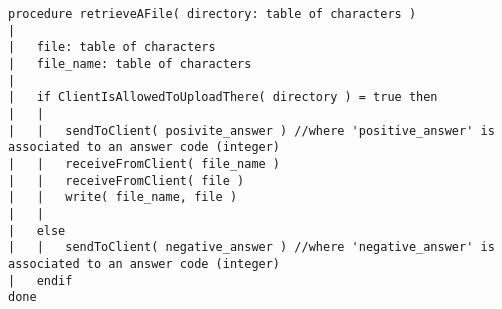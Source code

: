 \begin{lstlisting}[breaklines]
procedure retrieveAFile( directory: table of characters )
|
|	file: table of characters
|	file_name: table of characters
|	
|	if ClientIsAllowedToUploadThere( directory ) = true then
|	|
|	|	sendToClient( posivite_answer ) //where 'positive_answer' is associated to an answer code (integer)
|	|	receiveFromClient( file_name )
|	|	receiveFromClient( file )
|	|	write( file_name, file )
|	|	
|	else
|	|	sendToClient( negative_answer ) //where 'negative_answer' is associated to an answer code (integer)
|	endif
done
\end{lstlisting}